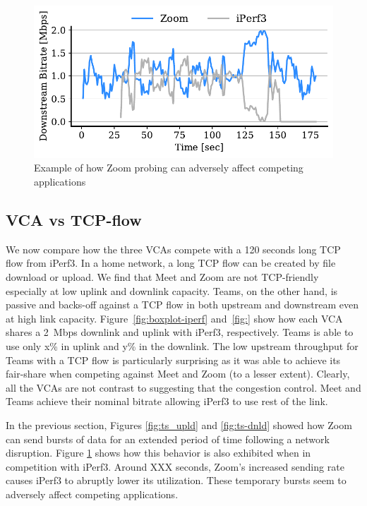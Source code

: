 \begin{figure}[th]
    \centering
    \includegraphics[width=\linewidth]{figures/comp_ts/zoom_iperf_2_dl_r3.pdf}
    \caption{Example of how Zoom probing can adversely affect competing applications}
	\label{fig:zoom-iperf-dl-2}
\end{figure}


\subsection{VCA vs TCP-flow}
We now compare how the three VCAs compete with a 120 seconds long TCP flow from iPerf3. In a home network, a long TCP flow can be created by file download or upload. We find that Meet and Zoom are not TCP-friendly especially at low uplink and downlink capacity. Teams, on the other hand,  is passive and backs-off against a TCP flow in both upstream and downstream even at high link capacity. Figure~\ref{fig:boxplot-iperf} and~\ref{fig:} show how each VCA shares a 2~Mbps downlink and uplink with iPerf3, respectively. Teams is able to use only x\% in uplink and y\% in the downlink. The low upstream throughput for Teams with a TCP flow is particularly surprising as it was able to achieve its fair-share when competing against Meet and Zoom (to a lesser extent). Clearly, all the VCAs are not   contrast to suggesting that the congestion control. Meet and Teams achieve their nominal bitrate allowing iPerf3 to use rest of the link. 


In the previous section, Figures \ref{fig:ts_upld} and \ref{fig:ts-dnld} showed how Zoom can send bursts of data for an extended period of time following a network disruption. Figure \ref{fig:zoom-iperf-dl-2} shows how this behavior is also exhibited when in competition with iPerf3. Around XXX seconds, Zoom's increased sending rate causes iPerf3 to abruptly lower its utilization. These temporary bursts seem to adversely affect competing applications. 


